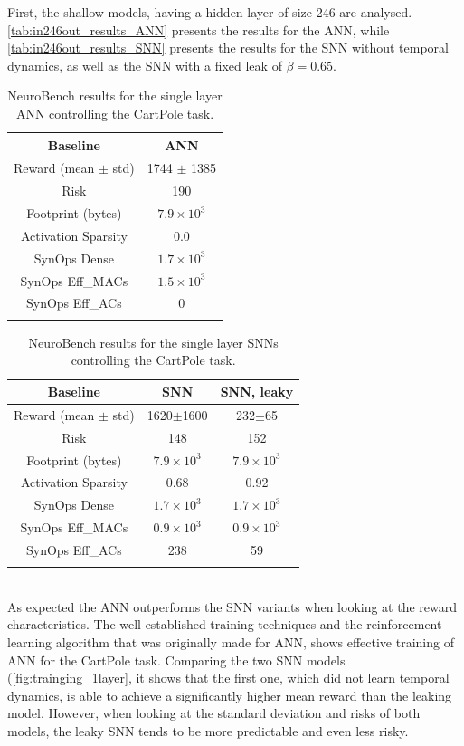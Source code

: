 First, the shallow models, having a hidden layer of size 246 are analysed. \autoref{tab:in246out_results_ANN} presents the results for the ANN, while \autoref{tab:in246out_results_SNN} presents the results for the SNN without temporal dynamics, as well as the SNN with a fixed leak of $\beta=0.65$.
\begin{table}[h]
\centering
\renewcommand{\arraystretch}{1.5}
\begin{tabular}{c|c} \thickhline
 Baseline & ANN\\ \hline
 Reward (mean $\pm$ std) & 1744 $\pm$ 1385 \\
 Risk & 190 \\ \hline
 Footprint (bytes) & $7.9 \times 10^3$ \\
 Activation Sparsity & 0.0 \\
 SynOps Dense & $1.7 \times 10^{3}$ \\
 SynOps Eff\_MACs & $1.5 \times 10^{3}$ \\
 SynOps Eff\_ACs & 0 \\ \thickhline
\end{tabular}
\caption{NeuroBench results for the single layer ANN controlling the CartPole task.}
\label{tab:in246out_results_ANN}
\end{table}
\begin{table}[h]
\centering
\renewcommand{\arraystretch}{1.5}
\begin{tabular}{c|cc} \thickhline
 Baseline  & SNN& SNN, leaky\\ \hline
 Reward (mean $\pm$ std)  & 1620$\pm$1600& 232$\pm$65 \\
 Risk  & 148& 152\\ \hline
 Footprint (bytes)  & $7.9 \times 10^3$& $7.9 \times 10^3$ \\
 Activation Sparsity & 0.68& 0.92\\
 SynOps Dense  & $1.7 \times 10^{3}$ & $1.7 \times 10^{3}$\\
 SynOps Eff\_MACs & $0.9\times 10^{3}$ &$0.9\times 10^{3}$\\
 SynOps Eff\_ACs & 238 &59\\ \thickhline
\end{tabular}
\caption{NeuroBench results for the single layer SNNs controlling the CartPole task.}
\label{tab:in246out_results_SNN}
\end{table}\\
As expected the ANN outperforms the SNN variants when looking at the reward characteristics. The well established training techniques and the reinforcement learning algorithm that was originally made for ANN, shows effective training of ANN for the CartPole task. Comparing the two SNN models (\autoref{fig:trainging_1layer}, it shows that the first one, which did not learn temporal dynamics, is able to achieve a significantly higher mean reward than the leaking model. However, when looking at the standard deviation and risks of both models, the leaky SNN tends to be more predictable and even less risky.
